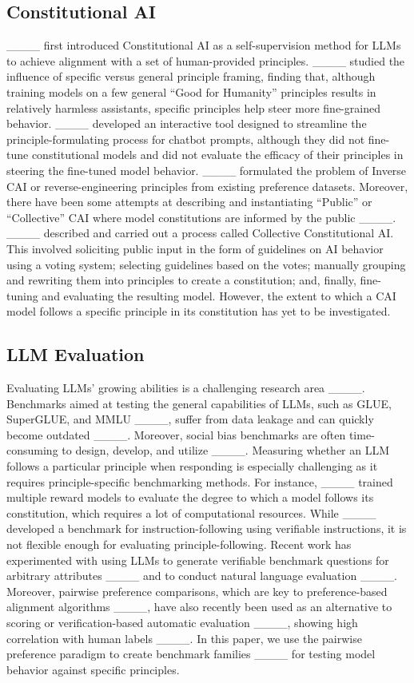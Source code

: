 \subsection{Constitutional AI}
____ first introduced Constitutional AI as a self-supervision method for LLMs to achieve alignment with a set of human-provided principles. ____ studied the influence of specific versus general principle framing, finding that, although training models on a few general ``Good for Humanity'' principles results in relatively harmless assistants, specific principles help steer more fine-grained behavior. ____ developed an interactive tool designed to streamline the principle-formulating process for chatbot prompts, although they did not fine-tune constitutional models and did not evaluate the efficacy of their principles in steering the fine-tuned model behavior. ____ formulated the problem of Inverse CAI or reverse-engineering principles from existing preference datasets. Moreover, there have been some attempts at describing and instantiating ``Public'' or ``Collective'' CAI where model constitutions are informed by the public ____. ____ described and carried out a process called Collective Constitutional AI. This involved soliciting public input in the form of guidelines on AI behavior using a voting system; selecting guidelines based on the votes; manually grouping and rewriting them into principles to create a constitution; and, finally, fine-tuning and evaluating the resulting model. However, the extent to which a CAI model follows a specific principle in its constitution has yet to be investigated. 

\subsection{LLM Evaluation}
Evaluating LLMs' growing abilities is a challenging research area ____. Benchmarks aimed at testing the general capabilities of LLMs, such as GLUE, SuperGLUE, and MMLU ____, suffer from data leakage and can quickly become outdated ____. 
Moreover, social bias benchmarks are often time-consuming to design, develop, and utilize ____. 
Measuring whether an LLM follows a particular principle when responding is especially challenging as it requires principle-specific benchmarking methods. For instance, ____ trained multiple reward models to evaluate the degree to which a model follows its constitution, which requires a lot of computational resources. While ____ developed a benchmark for instruction-following using verifiable instructions, it is not flexible enough for evaluating principle-following. Recent work has experimented with using LLMs to generate verifiable benchmark questions for arbitrary attributes ____ and to conduct natural language evaluation ____. Moreover, pairwise preference comparisons, which are key to preference-based alignment algorithms ____, have also recently been used as an alternative to scoring or verification-based automatic evaluation ____, showing high correlation with human labels ____. In this paper, we use the pairwise preference paradigm to create benchmark families ____ for testing model behavior against specific principles.


